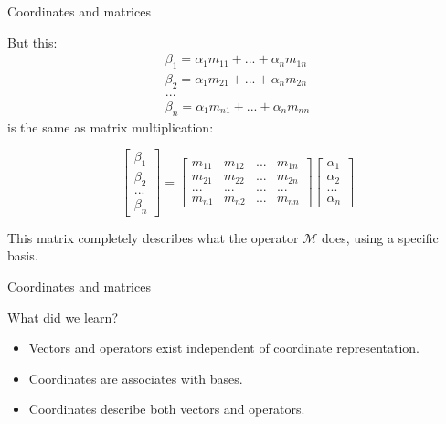 \documentclass{beamer}
\begin{document}
\begin{frame}{Coordinates and matrices}
	\begin{flushleft}
		
		But this:
		\begin{align*}
			\beta_1 = \alpha_1 m_{11} + ... + \alpha_n m_{1n} \\
			\beta_2 = \alpha_1 m_{21} + ... + \alpha_n m_{2n} \\
			... \\
			\beta_n = \alpha_1 m_{n1} + ... + \alpha_n m_{nn}
		\end{align*}		
	is the same as matrix multiplication:
	
		\begin{equation}
			\begin{bmatrix}
				\beta_1 \\ \beta_2 \\ ...\\ \beta_n
			\end{bmatrix}
		=
			\begin{bmatrix}
				m_{11} & m_{12} & ... & m_{1n} \\
				m_{21} & m_{22} & ... & m_{2n} \\
				... & ... & ... & ... \\
				m_{n1} & m_{n2} & ... & m_{nn} 
			\end{bmatrix}
			\begin{bmatrix}
				\alpha_1 \\ \alpha_2 \\ ...\\ \alpha_n
			\end{bmatrix}
		\end{equation}
		
		This matrix completely describes what the operator $\mathcal{M}$ does, using a specific basis.
		
	\end{flushleft}
\end{frame}



\begin{frame}{Coordinates and matrices}
	\begin{flushleft}
		
		What did we learn?
		
		\begin{itemize}
			\item Vectors and operators exist independent of coordinate representation.
			\item Coordinates are associates with bases.
			\item Coordinates describe both vectors and operators.
		\end{itemize}
		
		
	\end{flushleft}
\end{frame}
\end{document}
